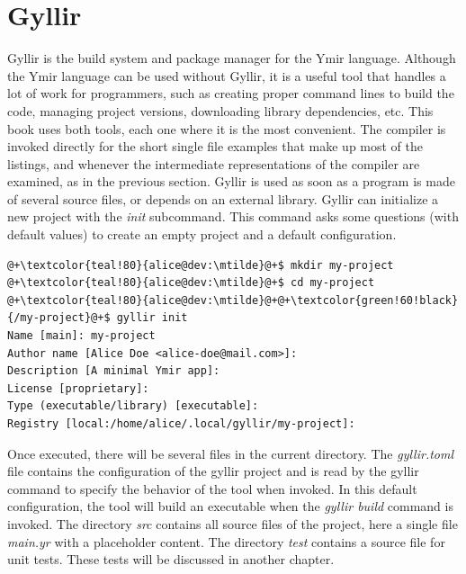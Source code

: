 \section{Gyllir}

Gyllir is the build system and package manager for the Ymir language. Although
the Ymir language can be used without Gyllir, it is a useful tool that handles a
lot of work for programmers, such as creating proper command lines to build the
code, managing project versions, downloading library dependencies, etc. This
book uses both tools, each one where it is the most convenient. The compiler
 is invoked directly for the short single file examples that make up
most of the listings, and whenever the intermediate representations of the
compiler are examined, as in the previous section. Gyllir is used as soon as a
program is made of several source files, or depends on an external
library. Gyllir can initialize a new project with the
\textit{init} subcommand. This command asks some questions (with default values)
to create an empty project and a default configuration.

\begin{lstlisting}[style=bashVerb, escapechar=@+]
@+\textcolor{teal!80}{alice@dev:\mtilde}@+$ mkdir my-project
@+\textcolor{teal!80}{alice@dev:\mtilde}@+$ cd my-project
@+\textcolor{teal!80}{alice@dev:\mtilde}@+@+\textcolor{green!60!black}{/my-project}@+$ gyllir init
Name [main]: my-project
Author name [Alice Doe <alice-doe@mail.com>]:
Description [A minimal Ymir app]:
License [proprietary]:
Type (executable/library) [executable]:
Registry [local:/home/alice/.local/gyllir/my-project]:
\end{lstlisting}

Once executed, there will be several files in the current directory.
The \textit{gyllir.toml} file contains the configuration of the gyllir project
and is read by the gyllir command to specify the behavior of the tool when
invoked. In this default configuration, the tool will build an executable when
the \textit{gyllir build} command is invoked. The directory \textit{src}
contains all source files of the project, here a single file \textit{main.yr}
with a placeholder content. The directory \textit{test} contains a source file
for unit tests. These tests will be discussed in another chapter.

